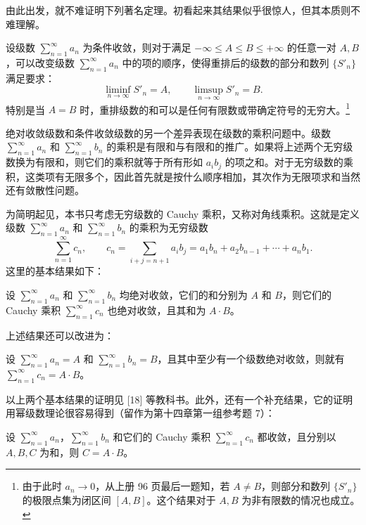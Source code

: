 由此出发，就不难证明下列著名定理。初看起来其结果似乎很惊人，但其本质则不难理解。

\begin{xproposition}
设级数 $\sum_{n=1}^{\infty}a_n$ 为条件收敛，则对于满足 $-\infty\leq A\leq B\leq+\infty$ 的任意一对 $A,B$，可以改变级数 $\sum_{n=1}^{\infty}a_n$ 中的项的顺序，使得重排后的级数的部分和数列 $\{S'_n\}$ 满足要求：
\[
\liminf_{n\to\infty}S'_n=A,\qquad \limsup_{n\to\infty}S'_n=B.
\]
特别是当 $A=B$ 时，重排级数的和可以是任何有限数或带确定符号的无穷大。\footnote{由于此时 $a_n\to0$，从上册 96 页最后一题知，若 $A\neq B$，则部分和数列 $\{S'_n\}$ 的极限点集为闭区间 $[A,B]$。这个结果对于 $A,B$ 为非有限数的情况也成立。}
\end{xproposition}

绝对收敛级数和条件收敛级数的另一个差异表现在级数的乘积问题中。级数 $\sum_{n=1}^{\infty}a_n$ 和 $\sum_{n=1}^{\infty}b_n$ 的乘积是有限和与有限和的推广。如果将上述两个无穷级数换为有限和，则它们的乘积就等于所有形如 $a_ib_j$ 的项之和。对于无穷级数的乘积，这类项有无限多个，因此首先就是按什么顺序相加，其次作为无限项求和当然还有敛散性问题。

为简明起见，本书只考虑无穷级数的 Cauchy 乘积，又称对角线乘积。这就是定义级数 $\sum_{n=1}^{\infty}a_n$ 和 $\sum_{n=1}^{\infty}b_n$ 的乘积为无穷级数
\[
\sum_{n=1}^{\infty}c_n,\qquad c_n=\sum_{i+j=n+1}a_ib_j=a_1b_n+a_2b_{n-1}+\cdots+a_nb_1.
\]
这里的基本结果如下：

\begin{xproposition}[13.3.5]
设 $\sum_{n=1}^{\infty}a_n$ 和 $\sum_{n=1}^{\infty}b_n$ 均绝对收敛，它们的和分别为 $A$ 和 $B$，则它们的 Cauchy 乘积 $\sum_{n=1}^{\infty}c_n$ 也绝对收敛，且其和为 $A\cdot B$。
\end{xproposition}

上述结果还可以改进为：

\begin{xproposition}
设 $\sum_{n=1}^{\infty}a_n=A$ 和 $\sum_{n=1}^{\infty}b_n=B$，且其中至少有一个级数绝对收敛，则就有 $\sum_{n=1}^{\infty}c_n=A\cdot B$。
\end{xproposition}

以上两个基本结果的证明见 [18] 等教科书。此外，还有一个补充结果，它的证明用幂级数理论很容易得到（留作为第十四章第一组参考题 7）：

\begin{xproposition}[13.3.7]
设 $\sum_{n=1}^{\infty}a_n$，$\sum_{n=1}^{\infty}b_n$ 和它们的 Cauchy 乘积 $\sum_{n=1}^{\infty}c_n$ 都收敛，且分别以 $A,B,C$ 为和，则 $C=A\cdot B$。
\end{xproposition}

